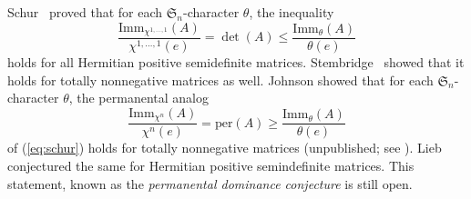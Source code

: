 \documentclass[12pt]{amsart}
\numberwithin{equation}{section}
\newcommand{\sn}{\mathfrak{S}_n}
\newcommand{\imm}[1]{\mathrm{Imm}_{#1}}
\newcommand{\perm}{\mathrm{per}}
\begin{document}
Schur~\cite{SchurUberendliche} proved that for each $\sn$-character $\theta$,
the inequality
\begin{equation}\label{eq:schur}
  \frac{\imm{\chi^{1,\dotsc, 1}}(A)}{\chi^{1, \dots, 1}(e)} = \det(A)
  \leq \frac{\imm \theta(A)}{\theta(e)}
\end{equation}
holds for all Hermitian positive semidefinite matrices.
Stembridge~\cite[Cor.\,3.4]{StemImm} showed that it holds
for totally nonnegative matrices as well.
Johnson showed that for each $\sn$-character $\theta$, the
permanental analog 
\begin{equation}\label{eq:liebdominance}
  \frac{\imm{\chi^n}(A)}{\chi^n(e)} = \perm(A)
  \geq \frac{\imm \theta(A)}{\theta(e)}
\end{equation}
of (\ref{eq:schur}) holds for totally nonnegative matrices
(unpublished; see \cite[p.\,1088]{StemConj}).
Lieb~\cite{LiebPerm} conjectured the same for Hermitian positive semindefinite
matrices.  This statement, known as the {\em permanental dominance conjecture}
is still open.
\end{document}
